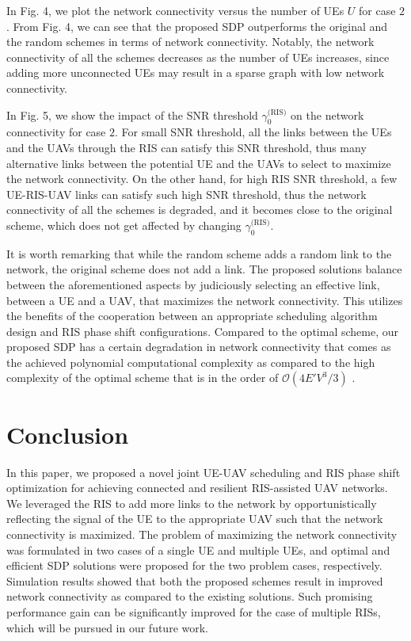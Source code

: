 \documentclass[conference]{IEEEtran}
\begin{document}
  



  
In Fig. 4, we plot the network connectivity versus the number of UEs $U$ for case $2$. From Fig. 4, we can see that the proposed SDP outperforms the original and the random schemes in terms of network connectivity. Notably, the network connectivity of all the schemes decreases as  the number of UEs increases, since adding more unconnected UEs may result in a sparse graph with low network connectivity.


In Fig. 5, we show the impact of the SNR threshold $\gamma_0^\text{(RIS)}$ on the network connectivity for case $2$. For small SNR threshold,   all the links between the UEs and the UAVs through the RIS can satisfy this SNR threshold, thus many alternative links between the potential UE and the UAVs to select to maximize the network connectivity. On the other hand, for high RIS SNR threshold, a few UE-RIS-UAV links can satisfy such high SNR threshold,  thus the network connectivity of all the schemes is degraded, and it becomes close to the original scheme, which does not get affected by changing $\gamma_0^\text{(RIS)}$.

It is worth remarking that while the random scheme adds a random link to the network, the original scheme does not add a link. The proposed solutions balance between the aforementioned aspects by judiciously selecting an effective link, between a UE and a UAV,  that maximizes the network connectivity. This utilizes the benefits of the cooperation between an appropriate scheduling algorithm design and RIS phase shift configurations.  Compared to the optimal scheme, our proposed SDP has a certain degradation in network connectivity that comes as the
achieved polynomial computational complexity as compared to the high complexity of the optimal scheme that is in the order of $\mathcal O(4 E' V^3/3)$ \cite{L}.
 



\section{Conclusion}\label{C}

In this paper, we proposed a novel joint UE-UAV scheduling and RIS phase shift optimization for achieving connected and resilient RIS-assisted UAV networks. We leveraged the RIS to add more links to the network by opportunistically reflecting the signal of the UE to the appropriate UAV such that the network connectivity is maximized. The problem of maximizing the network connectivity was 
formulated in two cases of a single UE and multiple UEs, and optimal and efficient SDP solutions were proposed for the two problem cases, respectively. Simulation results showed that both the proposed schemes result in improved  network connectivity as compared to the existing solutions. Such promising performance gain can be significantly improved for the case of multiple RISs, which will be pursued in our future work.
\end{document}
